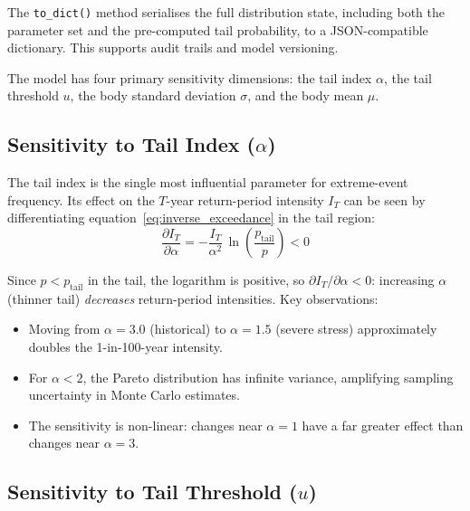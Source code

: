 \documentclass[11pt,a4paper]{article}
\begin{document}
The \texttt{to\_dict()} method serialises the full distribution state, including
both the parameter set and the pre-computed tail probability, to a JSON-compatible
dictionary. This supports audit trails and model versioning.

\mkmsensitivity

The model has four primary sensitivity dimensions: the tail index $\alpha$, the
tail threshold $u$, the body standard deviation $\sigma$, and the body mean $\mu$.



\subsection{Sensitivity to Tail Index ($\alpha$)}

The tail index is the single most influential parameter for extreme-event
frequency. Its effect on the $T$-year return-period intensity $I_T$ can be seen
by differentiating equation~\eqref{eq:inverse_exceedance} in the tail region:
\begin{equation}
    \frac{\partial I_T}{\partial \alpha}
    = -\frac{I_T}{\alpha^2}\,\ln\!\left(\frac{p_{\text{tail}}}{p}\right)
    < 0
    \label{eq:sensitivity_alpha}
\end{equation}

\noindent Since $p < p_{\text{tail}}$ in the tail, the logarithm is positive, so
$\partial I_T / \partial \alpha < 0$: increasing $\alpha$ (thinner tail) \emph{decreases}
return-period intensities. Key observations:

\begin{itemize}[nosep]
    \item Moving from $\alpha = 3.0$ (historical) to $\alpha = 1.5$ (severe stress)
          approximately doubles the 1-in-100-year intensity.
    \item For $\alpha < 2$, the Pareto distribution has infinite variance, amplifying
          sampling uncertainty in Monte Carlo estimates.
    \item The sensitivity is non-linear: changes near $\alpha = 1$ have a far greater
          effect than changes near $\alpha = 3$.
\end{itemize}

\subsection{Sensitivity to Tail Threshold ($u$)}
\end{document}
